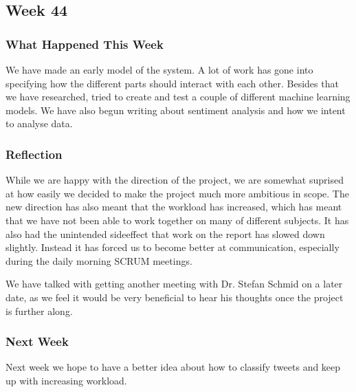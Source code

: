 \subsection{Week 44}
\subsubsection{What Happened This Week}
We have made an early model of the system. A lot of work has gone into
specifying how the different parts should interact with each other. Besides that
we have researched, tried to create and test a couple of different machine
learning models. We have also begun writing about sentiment analysis and how we
intent to analyse data.


\subsubsection{Reflection}
While we are happy with the direction of the project, we are somewhat suprised
at how easily we decided to make the project much more ambitious in scope. The
new direction has also meant that the workload has increased, which has meant
that we have not been able to work together on many of different subjects. It
has also had the unintended sideeffect that work on the report has slowed down
slightly. Instead it has forced us to become better at communication,
especially during the daily morning SCRUM meetings.\nl

We have talked with getting another meeting with Dr. Stefan Schmid on a later
date, as we feel it would be very beneficial to hear his thoughts once the
project is further along.

\subsubsection{Next Week} 
Next week we hope to have a better idea about how to classify tweets and
keep up with increasing workload.


